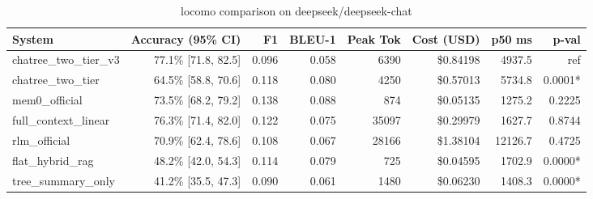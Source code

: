 \begin{table}[t]
\centering
\small
\begin{tabular}{lrrrrrrr}
\toprule
\textbf{System} & \textbf{Accuracy (95\% CI)} & \textbf{F1} & \textbf{BLEU-1} & \textbf{Peak Tok} & \textbf{Cost (USD)} & \textbf{p50 ms} & \textbf{p-val} \\
\midrule
chatree\_two\_tier\_v3 & 77.1\% [71.8, 82.5] & 0.096 & 0.058 & 6390 & \$0.84198 & 4937.5 & ref \\
chatree\_two\_tier & 64.5\% [58.8, 70.6] & 0.118 & 0.080 & 4250 & \$0.57013 & 5734.8 & 0.0001* \\
mem0\_official & 73.5\% [68.2, 79.2] & 0.138 & 0.088 & 874 & \$0.05135 & 1275.2 & 0.2225 \\
full\_context\_linear & 76.3\% [71.4, 82.0] & 0.122 & 0.075 & 35097 & \$0.29979 & 1627.7 & 0.8744 \\
rlm\_official & 70.9\% [62.4, 78.6] & 0.108 & 0.067 & 28166 & \$1.38104 & 12126.7 & 0.4725 \\
flat\_hybrid\_rag & 48.2\% [42.0, 54.3] & 0.114 & 0.079 & 725 & \$0.04595 & 1702.9 & 0.0000* \\
tree\_summary\_only & 41.2\% [35.5, 47.3] & 0.090 & 0.061 & 1480 & \$0.06230 & 1408.3 & 0.0000* \\
\bottomrule
\end{tabular}
\caption{locomo comparison on deepseek/deepseek-chat}
\label{tab:locomo}
\end{table}
